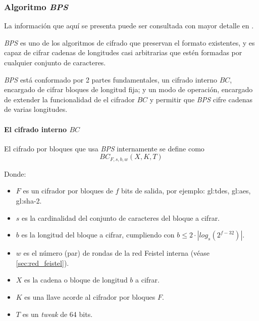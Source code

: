 %
%

\subsubsection{Algoritmo \textit{BPS}}

La información que aquí se presenta puede ser consultada con mayor detalle en
\cite{bps}.

\textit{BPS} es uno de los algoritmos de cifrado que preservan el formato
existentes, y es capaz de cifrar cadenas de longitudes casi arbitrarias que
estén formadas por cualquier conjunto de caracteres.

\textit{BPS} está conformado por 2 partes fundamentales, un cifrado interno
$BC$, encargado de cifrar bloques de longitud fija; y un modo de operación,
encargado de extender la funcionalidad de el cifrador $BC$ y permitir que
\textit{BPS} cifre cadenas de varias longitudes.


\paragraph{El cifrado interno $BC$}


El cifrado por bloques que usa \textit{BPS} internamente se define como
\begin{equation}
  BC_{F,s,b,w}(X,K,T)
\end{equation}

Donde:
\begin{itemize}
  \item $F$ es un cifrador por bloques de $f$ bits de salida,
    por ejemplo: \gls{gl:tdes}, \gls{gl:aes}, \gls{gl:sha}-2.
  \item $s$ es la cardinalidad del conjunto de caracteres del bloque a cifrar.
  \item $b$ es la longitud del bloque a cifrar,
    cumpliendo con $b \leq 2 \cdot |log_s(2^{f-32})|$.
  \item $w$ es el número (par) de rondas de la red Feistel interna
    (véase \ref{sec:red_feistel}).
  \item $X$ es la cadena o bloque de longitud $b$ a cifrar.
  \item $K$ es una llave acorde al cifrador por bloques $F$.
  \item $T$ es un \textit{tweak} de 64 bits.
\end{itemize}

